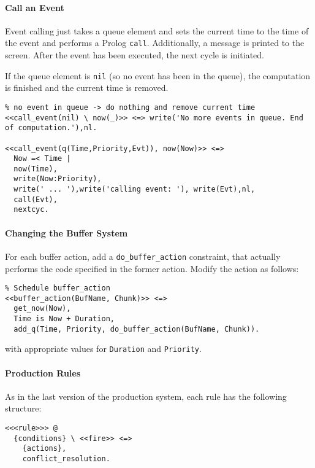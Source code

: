 \paragraph{Call an Event} 

Event calling just takes a queue element and sets the current time to the time of the event and performs a Prolog \lstinline|call|. Additionally, a message is printed to the screen. After the event has been executed, the next cycle is initiated.

If the queue element is \lstinline|nil| (so no event has been in the queue), the computation is finished and the current time is removed.

\begin{lstlisting}
% no event in queue -> do nothing and remove current time
<<call_event(nil) \ now(_)>> <=> write('No more events in queue. End of computation.'),nl.

<<call_event(q(Time,Priority,Evt)), now(Now)>> <=> 
  Now =< Time | 
  now(Time),
  write(Now:Priority),
  write(' ... '),write('calling event: '), write(Evt),nl,
  call(Evt),
  nextcyc.
\end{lstlisting}

\paragraph{Changing the Buffer System}
\label{changing_the_buffer_system}

For each buffer action, add a \lstinline|do_buffer_action| constraint, that actually performs the code specified in the former action. Modify the action as follows:

\begin{lstlisting}
% Schedule buffer_action
<<buffer_action(BufName, Chunk)>> <=> 
  get_now(Now),
  Time is Now + Duration, 
  add_q(Time, Priority, do_buffer_action(BufName, Chunk)). 
\end{lstlisting}

with appropriate values for \lstinline|Duration| and \lstinline|Priority|.

\paragraph{Production Rules}

As in the last version of the production system, each rule has the following structure:

\begin{lstlisting}
<<<rule>>> @
  {conditions} \ <<fire>> <=> 
    {actions}, 
    conflict_resolution.
\end{lstlisting}

